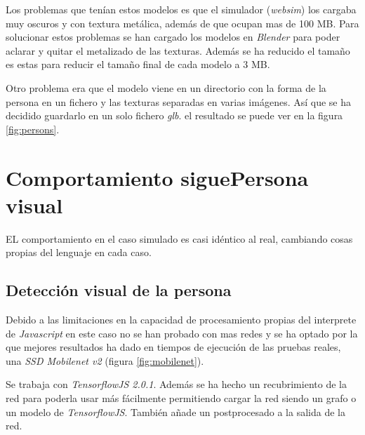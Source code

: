 Los problemas que tenían estos modelos es que el simulador (\textit{websim}) los cargaba muy oscuros y con textura metálica, además de que ocupan mas de 100 MB. Para solucionar estos problemas se han cargado los modelos en \textit{Blender} para poder aclarar y quitar el metalizado de las texturas. Además se ha reducido el tamaño es estas para reducir el tamaño final de cada modelo a 3 MB.

Otro problema era que el modelo viene en un directorio con la forma de la persona en un fichero y las texturas separadas en varias imágenes. Así que se ha decidido guardarlo en un solo fichero \textit{\acrfull{glb}}. el resultado se puede ver en la figura \ref{fig:persons}.
\section{Comportamiento siguePersona visual}
EL comportamiento en el caso simulado es casi idéntico al real, cambiando cosas propias del lenguaje en cada caso.
\subsection*{Detección visual de la persona}
Debido a las limitaciones en la capacidad de procesamiento propias del interprete de \textit{Javascript} en este caso no se han probado con mas redes y se ha optado por la que mejores resultados ha dado en tiempos de ejecución de las pruebas reales, una \textit{SSD  Mobilenet  v2} (figura \ref{fig:mobilenet}).

Se trabaja con \textit{TensorflowJS  2.0.1}. Además se ha hecho un recubrimiento de la red para poderla usar más fácilmente permitiendo cargar la red siendo un grafo o un modelo de \textit{TensorflowJS}. También añade un postprocesado a la salida de la red.

